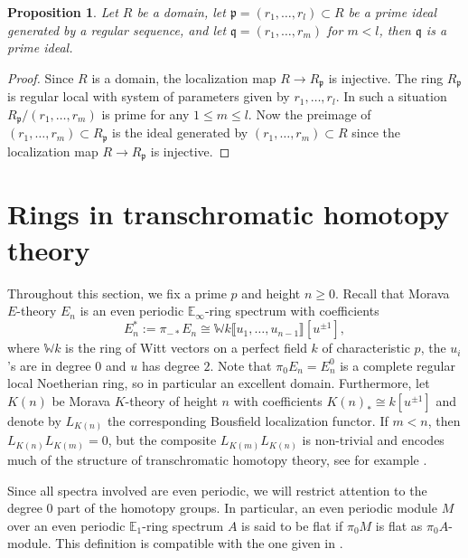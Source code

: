 \documentclass[oneside]{amsart}
\newtheorem{prop}[thm]{Proposition}
\theoremstyle{definition}
\theoremstyle{remark}
\theoremstyle{theorem}
\numberwithin{equation}{section}
\newcommand{\bE}{\mathbb{E}}
\newcommand{\fp}{\mathfrak{p}}
\newcommand{\fq}{\mathfrak{q}}
\newcommand{\bW}{\mathbb{W}}
\begin{document}
\begin{prop} \label{primeideal}
Let $R$ be a domain, let $\fp = (r_1, \ldots, r_l) \subset R$ be a prime ideal generated by a regular sequence, and let $\fq = (r_1, \ldots, r_m)$ for $m<l$, then $\fq$ is a prime ideal. 
\end{prop}
\begin{proof}
Since $R$ is a domain, the localization map $R \rightarrow R_{\fp}$ is injective. The ring $R_{\fp}$ is regular local with system of parameters given by $r_1, \ldots, r_l$. In such a situation $R_{\fp}/(r_1, \ldots, r_m)$ is prime for any $1 \leq m \leq l$. Now the preimage of $(r_1, \ldots, r_m) \subset R_{\fp}$ is the ideal generated by $(r_1, \ldots, r_m) \subset R$ since the localization map $R \rightarrow R_{\fp}$ is injective.
\end{proof}


\section{Rings in transchromatic homotopy theory}

Throughout this section, we fix a prime $p$ and height $n\ge 0$. Recall that Morava $E$-theory $E_n$ is an even periodic $\bE_{\infty}$-ring spectrum with coefficients
\[
E_n^* := \pi_{-*}E_n \cong \bW k \llbracket u_1,\ldots,u_{n-1} \rrbracket[u^{\pm 1}],
\]
where $\bW k$ is the ring of Witt vectors on a perfect field $k$ of characteristic $p$, the $u_i$'s are in degree 0 and $u$ has degree $2$. Note that $\pi_0E_n = E_n^0$ is a complete regular local Noetherian ring, so in particular an excellent domain. Furthermore, let $K(n)$ be Morava $K$-theory of height $n$ with coefficients $K(n)_* \cong k[u^{\pm 1}]$ and denote by $L_{K(n)}$ the corresponding Bousfield localization functor. If $m<n$, then $L_{K(n)}L_{K(m)}=0$, but the composite $L_{K(m)}L_{K(n)}$ is non-trivial and encodes much of the structure of transchromatic homotopy theory, see for example \cite{hovey_csc}.  

Since all spectra involved are even periodic, we will restrict attention to the degree 0 part of the homotopy groups. In particular, an even periodic module $M$ over an even periodic $\bE_1$-ring spectrum $A$ is said to be flat if $\pi_0M$ is flat as $\pi_0A$-module. This definition is compatible with the one given in \cite{frankland}. 
\end{document}
